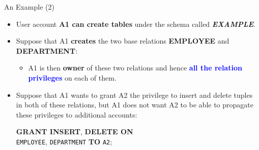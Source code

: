 \begin{frame}{An Example (2)}
    \Large %
    
    \begin{itemize}
        \vspace{-0.5cm} %
        
        \item User account \textbf{A1 can create tables} under the schema called \textbf{\textit{EXAMPLE}}.
        
        \item Suppose that A1 \textbf{creates} the two base relations \textbf{EMPLOYEE} and \textbf{DEPARTMENT}:
        
        \begin{itemize}
            \normalsize
            \setlength{\itemsep}{0.2cm}
            \item A1 is then \textbf{owner} of these two relations and hence \textcolor{blue}{\textbf{all the relation privileges}} on each of them.
        \end{itemize}
        
        \item Suppose that A1 wants to grant A2 the privilege to insert and delete tuples in both of these relations, but A1 does not want A2 to be able to propagate these privileges to additional accounts:
        
        \vspace{0.3cm} %
        
        {
            \normalsize \color{red!70!black} %
            \textbf{GRANT INSERT}, \textbf{DELETE ON} \\[0.1cm] %
            \hspace{1.5cm} \texttt{EMPLOYEE}, \texttt{DEPARTMENT} \textbf{TO} \texttt{A2}; %
        }
        
    \end{itemize}
\end{frame}




